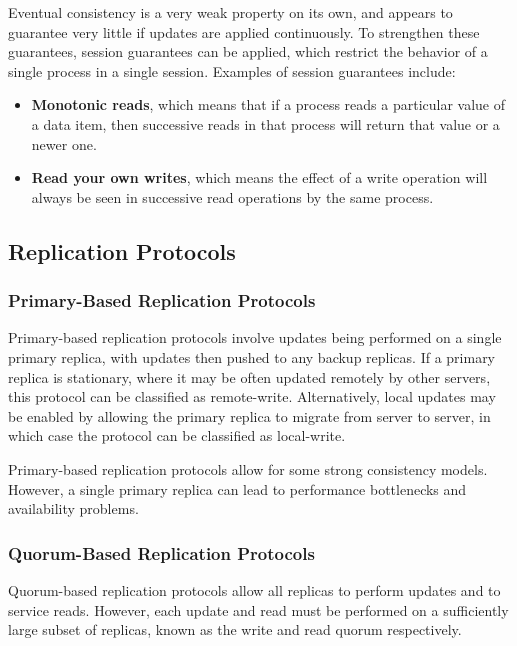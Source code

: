 \documentclass[12pt,titlepage]{article}
\begin{document}
        Eventual consistency is a very weak property on its own, and appears to guarantee very little if updates are applied continuously. To strengthen
        these guarantees, session guarantees can be applied, which restrict the behavior of a single process in a single session. Examples of session
        guarantees include:
        \begin{itemize}
          \item \textbf{Monotonic reads}, which means that if a process reads a particular value of a data item, then successive reads in that process will
            return that value or a newer one.
          \item \textbf{Read your own writes}, which means the effect of a write operation will always be seen in successive read operations by the same process.
        \end{itemize}

    \subsection{Replication Protocols}

      \subsubsection{Primary-Based Replication Protocols}
        Primary-based replication protocols involve updates being performed on a single primary replica, with updates then pushed to any backup replicas.
        If a primary replica is stationary, where it may be often updated remotely by other servers, this protocol can be classified as remote-write. Alternatively,
        local updates may be enabled by allowing the primary replica to migrate from server to server, in which case the protocol can be classified as local-write.

        Primary-based replication protocols allow for some strong consistency models. However, a single primary replica can lead to performance bottlenecks and
        availability problems.

      \subsubsection{Quorum-Based Replication Protocols}
        Quorum-based replication protocols allow all replicas to perform updates and to service reads. However, each update and read must be performed on a
        sufficiently large subset of replicas, known as the write and read quorum respectively.
\end{document}

